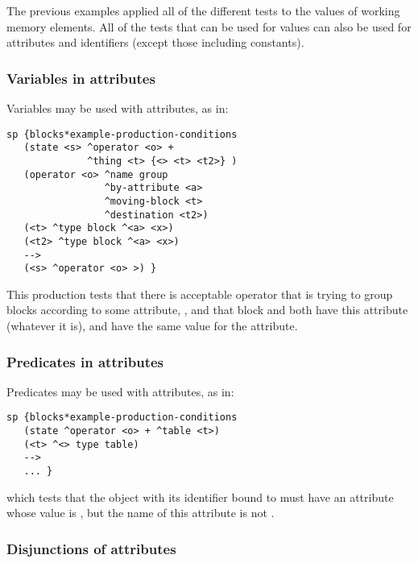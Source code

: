 The previous examples applied all of the different tests to the values of working memory elements. All of the tests that can be used for values can also be used for attributes and identifiers (except those including constants).

\subsubsection*{Variables in attributes}

Variables may be used with attributes, as in:

\begin{verbatim}
sp {blocks*example-production-conditions
   (state <s> ^operator <o> +
              ^thing <t> {<> <t> <t2>} )
   (operator <o> ^name group
                 ^by-attribute <a>
                 ^moving-block <t>
                 ^destination <t2>)
   (<t> ^type block ^<a> <x>)
   (<t2> ^type block ^<a> <x>)
   -->
   (<s> ^operator <o> >) }
\end{verbatim}

This production tests that there is acceptable operator that is trying to group blocks according to some attribute, , and that block  and  both have this attribute (whatever it is), and have the same value for the attribute.


\subsubsection*{Predicates in attributes}

Predicates may be used with attributes, as in:

\begin{verbatim}
sp {blocks*example-production-conditions
   (state ^operator <o> + ^table <t>)
   (<t> ^<> type table)
   -->
   ... }
\end{verbatim}

which tests that the object with its identifier bound to  must have an attribute whose value is , but the name of this attribute is not .

\subsubsection*{Disjunctions of attributes}
\index{<< >>}

